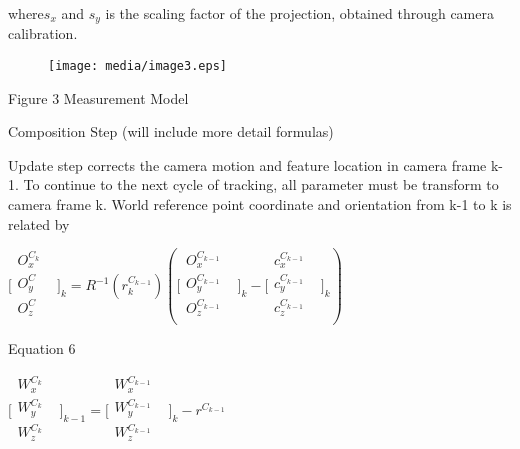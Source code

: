 where$s_{x}$ and $s_{y}$ is the scaling factor of the projection, 
obtained through camera calibration.

\begin{figure}[h]
\centering
\texttt{[image: media/image3.eps]}
\end{figure}


\begin{center}Figure 3 Measurement Model\end{center}





Composition Step (will include more detail formulas)

Update step corrects the camera motion and feature location in camera 
frame k-1. To continue to the next cycle of tracking, all parameter must 
be transform to camera frame k. World reference point coordinate and 
orientation from k-1 to k is related by

\begin{center}$\lbrack \begin{matrix}
O_{x}^{C_{k}} & \\
O_{y}^{C} & \\
O_{z}^{C} & \\
\end{matrix}
\rbrack _{k}=R^{-1}(r_{k}^{C_{k-1}})(\lbrack \begin{matrix}
O_{x}^{C_{k-1}} & \\
O_{y}^{C_{k-1}} & \\
O_{z}^{C_{k-1}} & \\
\end{matrix}
\rbrack _{k}- \lbrack \begin{matrix}
c_{x}^{C_{k-1}} & \\
c_{y}^{C_{k-1}} & \\
c_{z}^{C_{k-1}} & \\
\end{matrix}
\rbrack _{k})$\\
\end{center}

Equation 6

$\lbrack \begin{matrix}
 W_{x}^{C_{k}} & \\
W_{y}^{C_{k}} & \\
W_{z}^{C_{k}} & \\
\end{matrix}
\rbrack _{k-1}= \lbrack \begin{matrix}
 W_{x}^{C_{k-1}} & \\
W_{y}^{C_{k-1}} & \\
W_{z}^{C_{k-1}} & \\
\end{matrix}
\rbrack _{k}-r^{C_{k-1}}$\\


